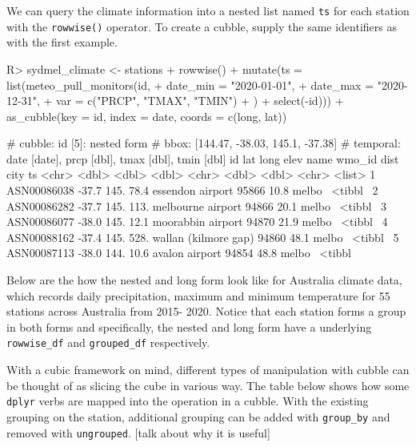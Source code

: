 \documentclass[
]{jss}
\begin{document}
We can query the climate information into a nested list named
\texttt{ts} for each station with the \texttt{rowwise()} operator. To
create a cubble, supply the same identifiers as with the first example.

\begin{CodeChunk}
\begin{CodeInput}
R> sydmel_climate <- stations %
+   rowwise() %
+   mutate(ts = list(meteo_pull_monitors(id,
+     date_min = "2020-01-01",
+     date_max = "2020-12-31",
+     var = c("PRCP", "TMAX", "TMIN")
+   ) %
+     select(-id))) %
+   as_cubble(key = id, index = date, coords = c(long, lat))
\end{CodeInput}
\end{CodeChunk}

\begin{CodeChunk}
\begin{CodeOutput}
# cubble:   id [5]: nested form
# bbox:     [144.47, -38.03, 145.1, -37.38]
# temporal: date [date], prcp [dbl], tmax [dbl], tmin [dbl]
  id            lat  long  elev name                 wmo_id  dist city   ts     
  <chr>       <dbl> <dbl> <dbl> <chr>                 <dbl> <dbl> <chr>  <list> 
1 ASN00086038 -37.7  145.  78.4 essendon airport      95866  10.8 melbo~ <tibbl~
2 ASN00086282 -37.7  145. 113.  melbourne airport     94866  20.1 melbo~ <tibbl~
3 ASN00086077 -38.0  145.  12.1 moorabbin airport     94870  21.9 melbo~ <tibbl~
4 ASN00088162 -37.4  145. 528.  wallan (kilmore gap)  94860  48.1 melbo~ <tibbl~
5 ASN00087113 -38.0  144.  10.6 avalon airport        94854  48.8 melbo~ <tibbl~
\end{CodeOutput}
\end{CodeChunk}

Below are the how the nested and long form look like for Australia
climate data, which records daily precipitation, maximum and minimum
temperature for 55 stations across Australia from 2015- 2020. Notice
that each station forms a group in both forms and specifically, the
nested and long form have a underlying \texttt{rowwise\_df} and
\texttt{grouped\_df} respectively.

With a cubic framework on mind, different types of manipulation with
cubble can be thought of as slicing the cube in various way. The table
below shows how some \texttt{dplyr} verbs are mapped into the operation
in a cubble. With the existing grouping on the station, additional
grouping can be added with \texttt{group\_by} and removed with
\texttt{ungrouped}. {[}talk about why it is useful{]}
\end{document}
